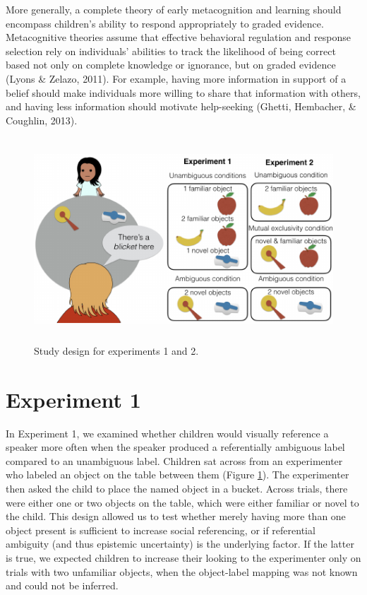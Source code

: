 \documentclass[a4paper,man,apacite,floatsintext]{apa6}
\newenvironment{CodeChunk}{}{}
\begin{document}
More generally, a complete theory of early metacognition and learning
should encompass children's ability to respond appropriately to graded
evidence. Metacognitive theories assume that effective behavioral
regulation and response selection rely on individuals' abilities to
track the likelihood of being correct based not only on complete
knowledge or ignorance, but on graded evidence (Lyons \& Zelazo, 2011).
For example, having more information in support of a belief should make
individuals more willing to share that information with others, and
having less information should motivate help-seeking (Ghetti, Hembacher,
\& Coughlin, 2013).

\begin{CodeChunk}
\begin{figure}[b]

{\centering \includegraphics[width=5in,height=3in]{figs/design-1} 

}

\caption[Study design for experiments 1 and 2]{Study design for experiments 1 and 2.}\label{fig:design}
\end{figure}
\end{CodeChunk}

\section{Experiment 1}\label{experiment-1}

In Experiment 1, we examined whether children would visually reference a
speaker more often when the speaker produced a referentially ambiguous
label compared to an unambiguous label. Children sat across from an
experimenter who labeled an object on the table between them (Figure
\ref{fig:design}). The experimenter then asked the child to place the
named object in a bucket. Across trials, there were either one or two
objects on the table, which were either familiar or novel to the child.
This design allowed us to test whether merely having more than one
object present is sufficient to increase social referencing, or if
referential ambiguity (and thus epistemic uncertainty) is the underlying
factor. If the latter is true, we expected children to increase their
looking to the experimenter only on trials with two unfamiliar objects,
when the object-label mapping was not known and could not be inferred.
\end{document}
